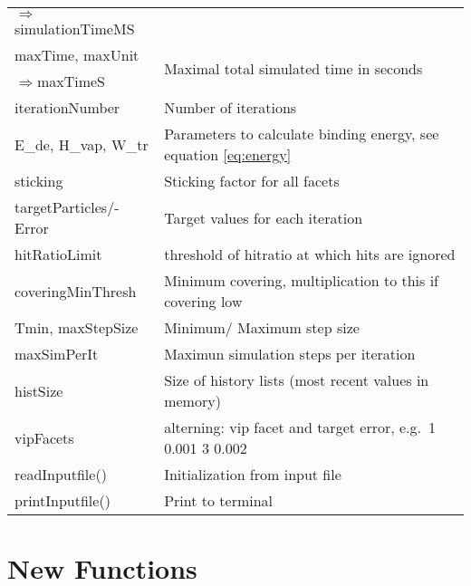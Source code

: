 \begin{center}
\begin{tabular}{|l|l|}
\enskip$\Rightarrow$simulationTimeMS&\\
\rule{0pt}{3ex} maxTime, maxUnit& \multirow{2}{*}{Maximal total simulated time in seconds}\\
\enskip$\Rightarrow$maxTimeS&\\
\rule{0pt}{3ex} iterationNumber& Number of iterations\\
\rule{0pt}{3ex}  E\_de, H\_vap, W\_tr& Parameters to calculate binding energy, see equation \ref{eq:energy}\\
\rule{0pt}{3ex}  sticking&  Sticking factor for all facets\\
\rule{0pt}{3ex}  targetParticles/-Error&  Target values for each iteration\\
\rule{0pt}{3ex}  hitRatioLimit&  threshold of hitratio at which hits are ignored\\
\rule{0pt}{3ex}  coveringMinThresh&  Minimum covering, multiplication to this if covering low\\
\rule{0pt}{3ex}  Tmin, maxStepSize&  Minimum/ Maximum step size\\
\rule{0pt}{3ex}  maxSimPerIt&  Maximun simulation steps per iteration\\
\rule{0pt}{3ex}  histSize&  Size of history lists (most recent values in memory)\\
\rule{0pt}{3ex}  vipFacets&  alterning: vip facet and target error, e.g.\ 1 0.001 3 0.002\\
\hline
\rule{0pt}{3ex} readInputfile()& Initialization from input file\\
\rule{0pt}{3ex} printInputfile()& Print to terminal\\
\hline
\end{tabular}
\end{center}

\section{New Functions}
